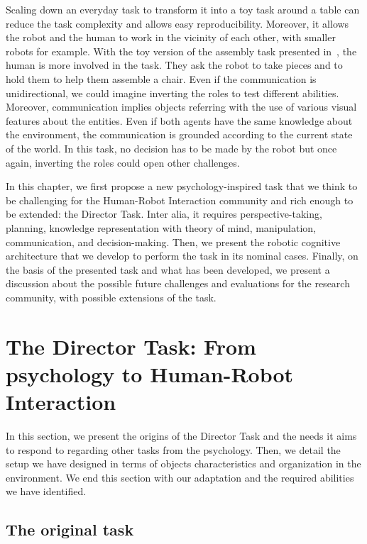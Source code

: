 \documentclass[a4paper,11pt,twoside]{StyleThese}
\begin{document}
Scaling down an everyday task to transform it into a toy task around a table can reduce the task complexity and allows easy reproducibility. Moreover, it allows the robot and the human to work in the vicinity of each other, with smaller robots for example. With the toy version of the assembly task presented in~\citep{brawer_2018_situated}, the human is more involved in the task. They ask the robot to take pieces and to hold them to help them assemble a chair. Even if the communication is unidirectional, we could imagine inverting the roles to test different abilities. Moreover, communication implies objects referring with the use of various visual features about the entities. Even if both agents have the same knowledge about the environment, the communication is grounded according to the current state of the world. In this task, no decision has to be made by the robot but once again, inverting the roles could open other challenges.


In this chapter, we first propose a new psychology-inspired task that we think to be challenging for the Human-Robot Interaction community and rich enough to be extended: the Director Task. Inter alia, it requires perspective-taking, planning, knowledge representation with theory of mind, manipulation, communication, and decision-making. Then, we present the robotic cognitive architecture that we develop to perform the task in its nominal cases. Finally, on the basis of the presented task and what has been developed, we present a discussion about the possible future challenges and evaluations for the research community, with possible extensions of the task.

\section{The Director Task: From psychology to Human-Robot Interaction}

In this section, we present the origins of the Director Task and the needs it aims to respond to regarding other tasks from the psychology. Then, we detail the setup we have designed in terms of objects characteristics and organization in the environment. We end this section with our adaptation and the required abilities we have identified.

\subsection{The original task}\label{chap9:subsec:psycho}
\end{document}
